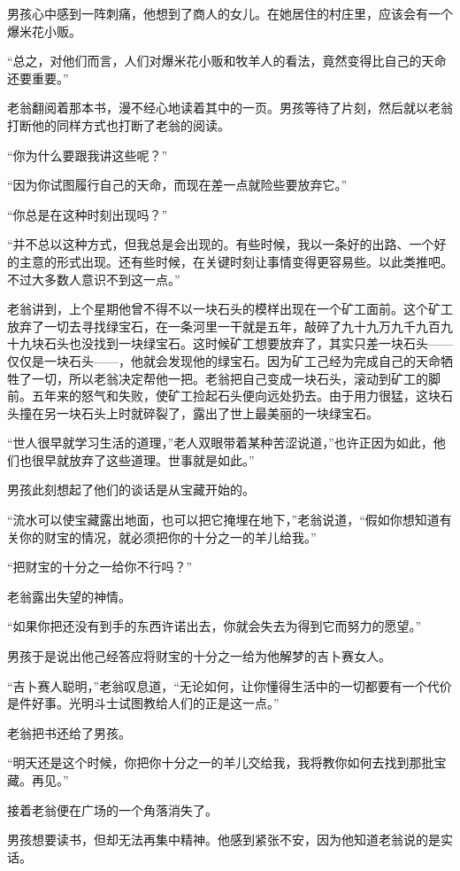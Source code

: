 \documentclass[twoside,openany]{book}
\begin{document}
男孩心中感到一阵刺痛，他想到了商人的女儿。在她居住的村庄里，应该会有一个爆米花小贩。

“总之，对他们而言，人们对爆米花小贩和牧羊人的看法，竟然变得比自己的天命还要重要。”

老翁翻阅着那本书，漫不经心地读着其中的一页。男孩等待了片刻，然后就以老翁打断他的同样方式也打断了老翁的阅读。

“你为什么要跟我讲这些呢？”

“因为你试图履行自己的天命，而现在差一点就险些要放弃它。”

“你总是在这种时刻出现吗？”

“并不总以这种方式，但我总是会出现的。有些时候，我以一条好的出路、一个好的主意的形式出现。还有些时候，在关键时刻让事情变得更容易些。以此类推吧。不过大多数人意识不到这一点。”

老翁讲到，上个星期他曾不得不以一块石头的模样出现在一个矿工面前。这个矿工放弃了一切去寻找绿宝石，在一条河里一干就是五年，敲碎了九十九万九千九百九十九块石头也没找到一块绿宝石。这时候矿工想要放弃了，其实只差一块石头——仅仅是一块石头——，他就会发现他的绿宝石。因为矿工己经为完成自己的天命牺牲了一切，所以老翁决定帮他一把。老翁把自己变成一块石头，滚动到矿工的脚前。五年来的怒气和失败，使矿工捡起石头便向远处扔去。由于用力很猛，这块石头撞在另一块石头上时就碎裂了，露出了世上最美丽的一块绿宝石。

“世人很早就学习生活的道理，”老人双眼带着某种苦涩说道，”也许正因为如此，他们也很早就放弃了这些道理。世事就是如此。”

男孩此刻想起了他们的谈话是从宝藏开始的。

“流水可以使宝藏露出地面，也可以把它掩埋在地下，”老翁说道，“假如你想知道有关你的财宝的情况，就必须把你的十分之一的羊儿给我。”

“把财宝的十分之一给你不行吗？”

老翁露出失望的神情。

“如果你把还没有到手的东西许诺出去，你就会失去为得到它而努力的愿望。”

男孩于是说出他己经答应将财宝的十分之一给为他解梦的吉卜赛女人。

“吉卜赛人聪明，”老翁叹息道，“无论如何，让你懂得生活中的一切都要有一个代价是件好事。光明斗士试图教给人们的正是这一点。”

老翁把书还给了男孩。

“明天还是这个时候，你把你十分之一的羊儿交给我，我将教你如何去找到那批宝藏。再见。”

接着老翁便在广场的一个角落消失了。

男孩想要读书，但却无法再集中精神。他感到紧张不安，因为他知道老翁说的是实话。
\end{document}
